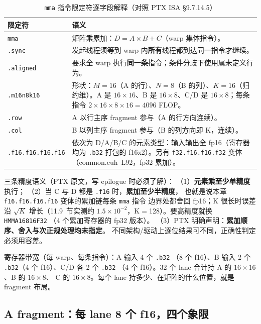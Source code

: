 \begin{table}[htbp]
\centering
\caption{\texttt{mma} 指令限定符逐字段解释（对照 PTX ISA §9.7.14.5）}
\label{tab:11-mma-fields}
\begin{tabular}{lp{10.6cm}}
\toprule
限定符 & 语义 \\
\midrule
\texttt{mma} & 矩阵乘累加：$D = A\times B + C$（warp 集体指令）。 \\
\texttt{.sync} & 发起线程须等到 warp 内\textbf{所有}线程都到达同一指令才继续。 \\
\texttt{.aligned} & 要求全 warp 执行\textbf{同一条}指令；条件分歧下使用属未定义行为。 \\
\texttt{.m16n8k16} & 形状：$M{=}16$（A 的行）、$N{=}8$（B 的列）、$K{=}16$（归约维）。A 是 $16\times16$、B 是 $16\times8$、C/D 是 $16\times8$；每条指令 $2\times16\times8\times16 = 4096$ FLOP。 \\
\texttt{.row} & A 以行主序 fragment 参与（A 的行方向连续）。 \\
\texttt{.col} & B 以列主序 fragment 参与（B 的列方向即 K，连续）。 \\
\texttt{.\allowbreak{}f16.f16.f16.f16} & 依次为 D/A/B/C 的元素类型：输入输出全 fp16（寄存器均为 \texttt{.b32} 打包的 f16x2）。另有 \texttt{f32.f16.f16.f32} 变体（common.cuh~L92，fp32 累加）。 \\
\bottomrule
\end{tabular}
\end{table}

三条精度语义（PTX 原文，写 epilogue 时必须了解）：
（1）\textbf{元素乘至少单精度}执行；
（2）当 C 与 D 都是 \texttt{.f16} 时，\textbf{累加至少半精度}，
也就是说本章 \texttt{f16.f16.f16.f16} 变体的累加链每条 \texttt{mma} 指令
边界处都舍回 fp16；K 很长时误差沿 $\sqrt{K}$ 增长（11.9~节实测约
$1.5\times10^{-2}$，K$=$128）。要高精度就换 \texttt{HMMA16816\allowbreak{}F32}
（4 个累加寄存器的 fp32 版本）。
（3）PTX 明确声明：\textbf{累加顺序、舍入与次正规处理均未指定}。
不同架构/驱动上逐位结果可不同，正确性判定必须用容差。

寄存器带宽（每 warp、每条指令）：A 输入 4 个 \texttt{.b32}
（8 个 f16）、B 输入 2 个 \texttt{.b32}（4 个 f16）、C/D 各 2 个 \texttt{.b32}
（4 个 f16）。32 个 lane 合计持 A 的 $16\times16$、B 的 $16\times8$、
C 的 $16\times8$。每个 lane 持多少、在矩阵的什么位置，就是 fragment 布局。

\subsection{A fragment：每 lane 8 个 f16，四个象限}

